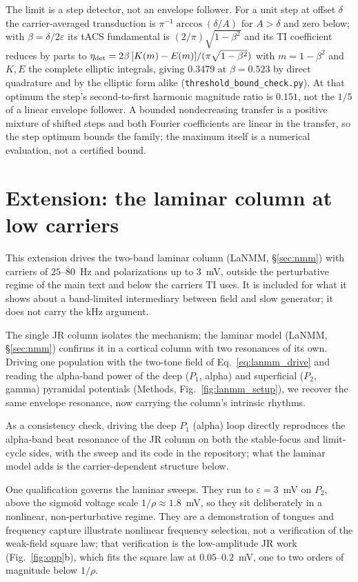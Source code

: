 \documentclass[11pt,a4paper]{article}
\providecommand{\DIFaddtex}[1]{{\protect\color{blue} \sf #1}} %
\providecommand{\DIFdeltex}[1]{{\protect\color{red} \scriptsize #1}} %
\providecommand{\DIFaddbegin}{} %
\providecommand{\DIFaddend}{} %
\providecommand{\DIFdelbegin}{} %
\providecommand{\DIFdelend}{} %
\providecommand{\DIFadd}[1]{\texorpdfstring{\DIFaddtex{#1}}{#1}} %
\providecommand{\DIFdel}[1]{\texorpdfstring{\DIFdeltex{#1}}{}} %
\begin{document}
The limit is a step detector, not an envelope follower. For a unit step at offset
$\delta$ the carrier-averaged transduction is $\pi^{-1}\arccos(\delta/A)$ for $A>\delta$
and zero below; with $\beta=\delta/2\varepsilon$ its tACS fundamental is
$(2/\pi)\sqrt{1-\beta^2}$ and its TI coefficient reduces by parts to
$\eta_{\rm det}=2\beta\,[K(m)-E(m)]/(\pi\sqrt{1-\beta^2})$ with $m=1-\beta^2$ and $K,E$
the complete elliptic integrals, giving $0.3479$ at $\beta=0.523$ by direct quadrature and
by the elliptic form alike (\texttt{threshold\_bound\_check.py}). At that optimum the
step's second-to-first harmonic magnitude ratio is $0.151$, not the $1/5$ of a linear
envelope follower. A bounded nondecreasing transfer is a positive mixture of shifted steps
and both Fourier coefficients are linear in the transfer, so the step optimum bounds the
family; the maximum itself is a numerical evaluation, not a certified bound.

\section{Extension: the laminar column at low carriers}\label{app:lanmm}
\label{sec:lanmm-results}
This extension drives the two-band laminar column (LaNMM, \S\ref{sec:nmm}) with carriers
of $25$--$80$~Hz and polarizations up to $3$~mV, outside the perturbative regime of the
main text and below the carriers TI uses. It is included for what it shows about a
band-limited intermediary between field and slow generator; it does not carry the kHz
argument.

The single JR column isolates the mechanism; the laminar model
(LaNMM, \S\ref{sec:nmm}) confirms it in a cortical column with two resonances of its
own. Driving one population with the two-tone field of Eq.~\eqref{eq:lanmm_drive}
and reading the alpha-band power of the deep ($P_1$, alpha) and superficial ($P_2$,
gamma) pyramidal potentials (Methods, Fig.~\ref{fig:lanmm_setup}), we recover the
same envelope resonance, now carrying the column's intrinsic rhythms.

As a consistency check, driving the deep $P_1$ (alpha) loop directly reproduces the
alpha-band beat resonance of the JR column on both the stable-focus and limit-cycle sides,
with the sweep and its code in the repository; what the laminar model adds is the
carrier-dependent structure below.

One qualification governs the laminar sweeps. They run to $\varepsilon=3$~mV on $P_2$,
above the sigmoid voltage scale $1/\rho\approx1.8$~mV, so they sit deliberately in a
nonlinear, non-perturbative regime. They \DIFdelbegin \DIFdel{are a demonstration of tongues and frequency capture}\DIFdelend \DIFaddbegin \DIFadd{illustrate nonlinear frequency selection}\DIFaddend , not a
verification of the weak-field square law; that verification is the
low-amplitude JR work (Fig.~\ref{fig:opp}b), which fits the square law at
$0.05$--$0.2$~mV, one to two orders of magnitude below $1/\rho$.
\end{document}
